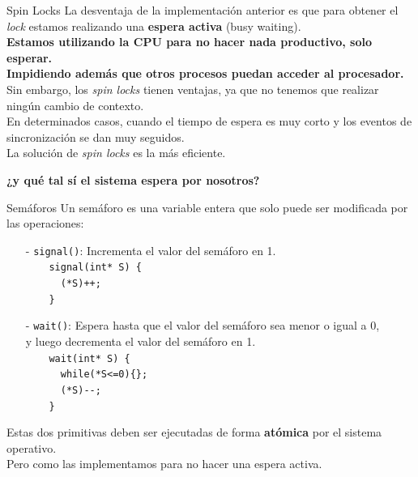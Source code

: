 \documentclass[aspectratio=169]{beamer}
\begin{document}
\begin{frame}{Spin Locks}
    La desventaja de la implementación anterior es que para obtener el \emph{lock} estamos realizando una \textbf{espera activa} (busy waiting).\\
    \bigskip
    \textcolor{verdeuca}{\textbf{Estamos utilizando la CPU para no hacer nada productivo, solo esperar.\\
    Impidiendo además que otros procesos puedan acceder al procesador.\\}}
    \bigskip
    \pause
    Sin embargo, los \emph{spin locks} tienen ventajas, ya que no tenemos que realizar\\ ningún cambio de contexto.\\
    \bigskip
    En determinados casos, cuando el tiempo de espera es muy corto y los eventos de sincronización se dan muy seguidos.\\
    \textcolor{naranjauca}{La solución de \emph{spin locks} es la más eficiente.}
    \begin{center}
    \pause
    \textcolor{verdeuca}{\textbf{¿y qué tal sí el sistema espera por nosotros?}}
    \end{center}
\end{frame}

\begin{frame}[fragile,t]{Semáforos}
Un semáforo es una variable entera que solo puede ser modificada por las operaciones:
\begin{itemize}
 \item[-] \textcolor{naranjauca}{\texttt{signal()}}: Incrementa el valor del semáforo en 1.\\
 \vspace{0.2cm}
    \verb|    signal(int* S) { |\\
    \verb|      (*S)++;        |\\
    \verb|    }                |\\ 
 \vspace{0.2cm}
 \item[-] \textcolor{naranjauca}{\texttt{wait()}}: Espera hasta que el valor del semáforo sea menor o igual a 0,\\
 \hspace{1.35cm}y luego decrementa el valor del semáforo en 1.\\
 \vspace{0.2cm}
    \verb|    wait(int* S) {   |\\
    \verb|      while(*S<=0){};|\\
    \verb|      (*S)--;        |\\ 
    \verb|    }                |\\
\end{itemize}
Estas dos primitivas deben ser ejecutadas de forma \textbf{atómica} por el sistema operativo.\\
\textcolor{naranjauca}{Pero como las implementamos para no hacer una espera activa.}
\end{frame}
\end{document}

